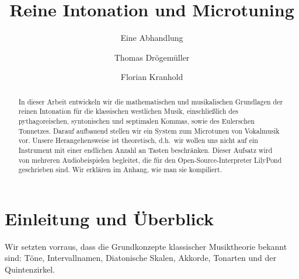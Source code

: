 \documentclass[ngerman,11pt]{scrartcl}
\title     {Reine Intonation und Microtuning}
\author    {Thomas Drögemüller\and Florian Kranhold}
\subtitle  {Eine Abhandlung}
\begin{document}
\maketitle

\begin{abstract}
  In dieser Arbeit entwickeln wir die mathematischen und musikalischen
  Grundlagen  der reinen Intonation für die klassischen westlichen Musik,
  einschließlich des pythagoreischen, syntonischen und septimalen Kommas, sowie
  des Eulerschen Tonnetzes. Darauf aufbauend stellen wir ein System zum
  Microtunen von Vokalmusik vor. Unsere Herangehensweise ist theoretisch,
  d.h.\ wir wollen uns nicht auf ein Instrument mit einer endlichen Anzahl an
  Tasten beschränken. Dieser Aufsatz wird von mehreren Audiobeispielen
  begleitet, die für den Open-Source-Interpreter LilyPond geschrieben sind. Wir
  erklären im Anhang, wie man sie kompiliert.
\end{abstract}

\section{Einleitung und Überblick}
\label{sec:int}

Wir setzten vorraus, dass die Grundkonzepte klassischer
Musiktheorie bekannt sind: Töne, Intervallnamen, Diatonische Skalen, Akkorde,
Tonarten und der Quintenzirkel.
\end{document}
